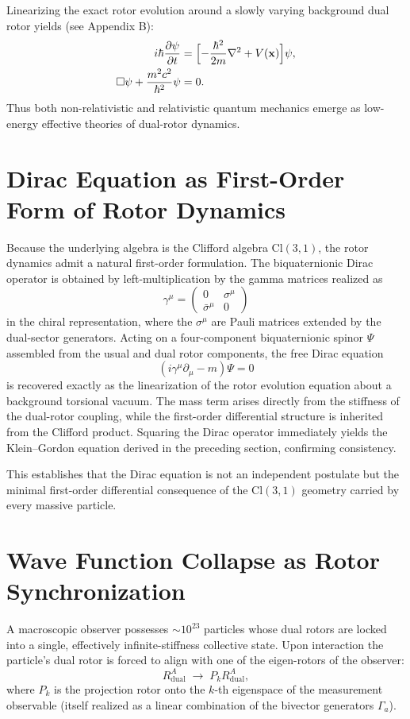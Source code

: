 \documentclass[dvipdfmx,a4paper]{article}
\begin{document}
Linearizing the exact rotor evolution around a slowly varying background dual rotor yields (see Appendix B):
\begin{align}
i\hbar \frac{\partial \psi}{\partial t}
  &= \Bigl[-\frac{\hbar^2}{2m}\nabla^2 + V(\mathbf{x})\Bigr]\psi, \\
\square \psi + \frac{m^2 c^2}{\hbar^2}\psi &= 0.
\end{align}
Thus both non-relativistic and relativistic quantum mechanics emerge as low-energy effective theories of dual-rotor dynamics.

\section{Dirac Equation as First-Order Form of Rotor Dynamics}

Because the underlying algebra is the Clifford algebra \(\mathrm{Cl}(3,1)\), the rotor dynamics admit a natural first-order formulation. The biquaternionic Dirac operator is obtained by left-multiplication by the gamma matrices realized as
\[
\gamma^\mu = \begin{pmatrix} 0 & \sigma^\mu \\ \bar{\sigma}^\mu & 0 \end{pmatrix}
\]
in the chiral representation, where the \(\sigma^\mu\) are Pauli matrices extended by the dual-sector generators. Acting on a four-component biquaternionic spinor \(\Psi\) assembled from the usual and dual rotor components, the free Dirac equation
\[
(i\gamma^\mu\partial_\mu - m)\Psi = 0
\]
is recovered exactly as the linearization of the rotor evolution equation about a background torsional vacuum. The mass term arises directly from the stiffness of the dual-rotor coupling, while the first-order differential structure is inherited from the Clifford product. Squaring the Dirac operator immediately yields the Klein–Gordon equation derived in the preceding section, confirming consistency.

This establishes that the Dirac equation is not an independent postulate but the minimal first-order differential consequence of the \(\mathrm{Cl}(3,1)\) geometry carried by every massive particle.

\section{Wave Function Collapse as Rotor Synchronization}

A macroscopic observer possesses \(\sim10^{23}\) particles whose dual rotors are locked into a single, effectively infinite-stiffness collective state. Upon interaction the particle’s dual rotor is forced to align with one of the eigen-rotors of the observer:
\[
R_\text{dual}^A \;\to\; P_k R_\text{dual}^A,
\]
where \(P_k\) is the projection rotor onto the \(k\)-th eigenspace of the measurement observable (itself realized as a linear combination of the bivector generators \(\Gamma_a\)).
\end{document}
